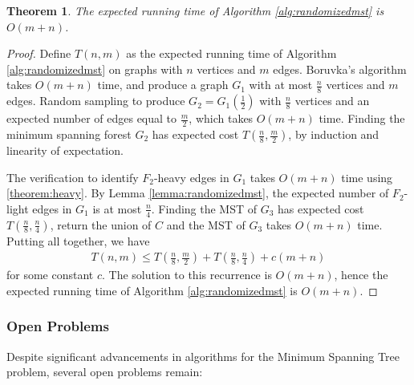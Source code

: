 \documentclass[11pt]{article}
\theoremstyle{plain}
\newtheorem{theorem}{Theorem}[section]
\begin{document}
\begin{theorem}
    The expected running time of Algorithm \ref{alg:randomizedmst} is $O(m+n)$.
\end{theorem}
\begin{proof}
    Define $T(n,m)$ as the expected running time of Algorithm \ref{alg:randomizedmst} on graphs with $n$ vertices and $m$ edges. Boruvka's algorithm takes $O(m+n)$ time, and produce a graph $G_1$ with at most $\frac{n}{8}$ vertices and $m$ edges. Random sampling to produce $G_2=G_1(\frac{1}{2})$ with $\frac{n}{8}$ vertices and an expected number of edges equal to $\frac{m}{2}$, which takes $O(m+n)$ time. Finding the minimum spanning forest $G_2$ has expected cost $T(\frac{n}{8},\frac{m}{2})$, by induction and linearity of expectation.

    The verification to identify $F_2$-heavy edges in $G_1$ takes $O(m+n)$ time using \ref{theorem:heavy}. By Lemma \ref{lemma:randomizedmst}, the expected number of $F_2$-light edges in $G_1$ is at most $\frac{n}{4}$. Finding the MST of $G_3$ has expected cost $T(\frac{n}{8},\frac{n}{4})$, return the union of $C$ and the MST of $G_3$ takes $O(m+n)$ time. Putting all together, we have
    \begin{align*}
        T\left(n,m\right)\leq T\left(\frac{n}{8},\frac{m}{2}\right)+T\left(\frac{n}{8},\frac{n}{4}\right)+c\left(m+n\right)
    \end{align*}
    for some constant $c$. The solution to this recurrence is $O(m+n)$, hence the expected running time of Algorithm \ref{alg:randomizedmst} is $O(m+n)$.
\end{proof}

\subsubsection{Open Problems}

Despite significant advancements in algorithms for the Minimum Spanning Tree problem, several open problems remain:
\end{document}
